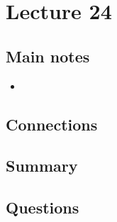 \section{Lecture 24}

\subsection{Main notes}


\begin{itemize}
	\item
\end{itemize}


\subsection{Connections}


\subsection{Summary}


\subsection{Questions}
